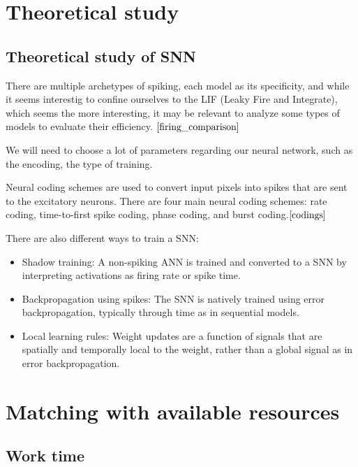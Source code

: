 \documentclass[11pt]{article}
\begin{document}
\section{Theoretical study}
\subsection{Theoretical study of SNN}

There are multiple archetypes of spiking, each model as its specificity, and while it seems interestig to confine ourselves to the LIF (Leaky Fire and Integrate), which seems the more interesting, it may be relevant to analyze some types of models to evaluate their efficiency. ${\cite{firing_comparison}}$

We will need to choose a lot of parameters regarding our neural network, such as the encoding, the type of training.

Neural coding schemes are used to convert input pixels into spikes that are sent to the excitatory neurons. There are four main neural coding schemes: rate coding, time-to-first spike coding, phase coding, and burst coding.${\cite{codings}}$

There are also different ways to train a SNN:
\begin{itemize}
  \item Shadow training: A non-spiking ANN is trained and converted to a SNN by interpreting activations as firing rate or spike time.
  \item Backpropagation using spikes: The SNN is natively trained using error backpropagation, typically through time as in sequential models.
  \item Local learning rules: Weight updates are a function of signals that are spatially and temporally local to the weight, rather than a global signal as in error backpropagation.
\end{itemize}

\pagebreak

\section{Matching with available resources}
\subsection{Work time}
\end{document}
